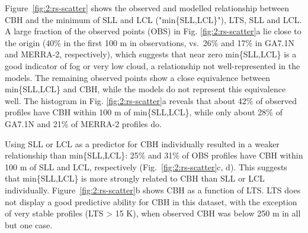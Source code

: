 Figure~\ref{fig:2:rs-scatter} shows the observed and modelled relationship
between CBH and the minimum of SLL and LCL ("min\{SLL,LCL\}"), LTS, SLL and
LCL. A large fraction of the observed points (OBS) in Fig.
\ref{fig:2:rs-scatter}a lie close to the origin (40\% in the first 100 m in
observations, vs.~26\% and 17\% in GA7.1N and MERRA-2, respectively), which
suggests that near zero min\{SLL,LCL\} is a good indicator of fog or very low
cloud, a relationship not well-represented in the models. The remaining
observed points show a close equivalence between min\{SLL,LCL\} and CBH, while
the models do not represent this equivalence well.  The histogram in Fig.
\ref{fig:2:rs-scatter}a reveals that about 42\% of observed profiles have CBH
within 100 \unit{m} of min\{SLL,LCL\}, while only about 28\% of GA7.1N and 21\%
of MERRA-2 profiles do.

Using SLL or LCL as a predictor for CBH individually resulted in a weaker
relationship than min\{SLL,LCL\}: 25\% and 31\% of OBS profiles have CBH within
100 \unit{m} of SLL and LCL, respectively (Fig.~\ref{fig:2:rs-scatter}c, d).
This suggests that min\{SLL,LCL\} is more strongly related to CBH than SLL or LCL
individually. Figure~\ref{fig:2:rs-scatter}b shows CBH as a function of LTS. LTS
does not display a good predictive ability for CBH in this dataset, with the
exception of very stable profiles (LTS > 15 K), when observed CBH was below 250
\unit{m} in all but one case.

